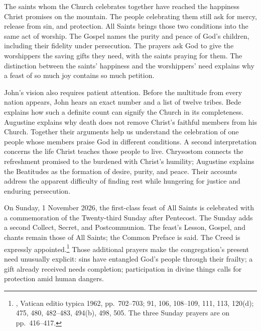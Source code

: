 The saints whom the Church celebrates together have reached the happiness
Christ promises on the mountain. The people celebrating them still ask for
mercy, release from sin, and protection. All Saints brings those two conditions
into the same act of worship. The Gospel names the purity and peace of God's
children, including their fidelity under persecution. The prayers ask God to
give the worshippers the saving gifts they need, with the saints praying for
them. The distinction between the saints' happiness and the worshippers' need
explains why a feast of so much joy contains so much petition.

John's vision also requires patient attention. Before the multitude from every
nation appears, John hears an exact number and a list of twelve tribes. Bede
explains how such a definite count can signify the Church in its completeness.
Augustine explains why death does not remove Christ's faithful members from
his Church. Together their arguments help us understand the celebration of one
people whose members praise God in different conditions. A second
interpretation concerns the life Christ teaches those people to live.
Chrysostom connects the refreshment promised to the burdened with Christ's
humility; Augustine explains the Beatitudes as the formation of desire,
purity, and peace. Their accounts address the apparent difficulty of finding
rest while hungering for justice and enduring persecution.

On Sunday, 1 November 2026, the first-class feast of All Saints is celebrated
with a commemoration of the Twenty-third Sunday after Pentecost. The Sunday
adds a second Collect, Secret, and Postcommunion. The feast's Lesson, Gospel,
and chants remain those of All Saints; the Common Preface is said. The Creed
is expressly appointed.\footnote{, Vatican editio
typica 1962, pp.~702--703;  91, 106, 108--109,
111, 113, 120(d);  475, 480,
482--483, 494(b), 498, 505. The three Sunday prayers are on pp.~416--417.}
Those additional prayers make the congregation's present need unusually
explicit: sins have entangled God's people through their frailty; a gift
already received needs completion; participation in divine things calls for
protection amid human dangers.

